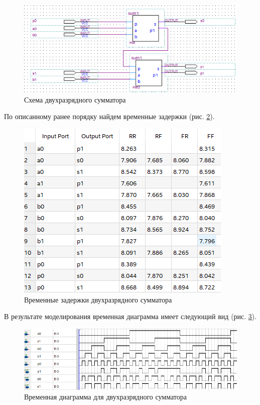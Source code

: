 \documentclass[a4paper,14pt]{article}
\begin{document}
\begin{figure}[H]
	\centering
	\includegraphics[width=0.7\linewidth]{image/lab4/04_2sum_bdf}
	\caption{Схема двухразрядного сумматора}
	\label{fig:042sumbdf}
\end{figure}

По описанному ранее порядку найдем временные задержки (рис. \ref{fig:042sumtime}).

\begin{figure}[H]
	\centering
	\includegraphics[width=0.7\linewidth]{image/lab4/04_2sum_time}
	\caption{Временные задержки двухразрядного сумматора}
	\label{fig:042sumtime}
\end{figure}

В результате моделирования временная диаграмма имеет следующий вид (рис. \ref{fig:042sumwvf}).

\begin{figure}[H]
	\centering
	\includegraphics[width=0.9\linewidth]{image/lab4/04_2sum_wvf}
	\caption{Временная диаграмма для двухразрядного сумматора}
	\label{fig:042sumwvf}
\end{figure}
\end{document}
